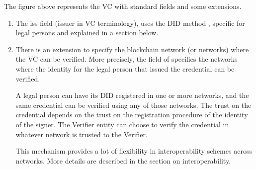 \documentclass[a4paper,12pt,english,openany]{sphinxmanual}
\begin{document}
\sphinxAtStartPar
The figure above represents the VC with standard fields and some extensions.
\begin{enumerate}
%
\item {} 
\sphinxAtStartPar
The iss field (issuer in VC terminology), uses the DID method , specific for legal persons and explained in a section below.

\item {} 
\sphinxAtStartPar
There is an extension to specify the blockchain network (or networks) where the VC can be verified. More precisely, the  field of  specifies the networks where the identity for the legal person that issued the credential can be verified.

\sphinxAtStartPar
A legal person can have its  DID registered in one or more networks, and the same credential can be verified using any of those networks. The trust on the credential depends on the trust on the registration procedure of the identity of the signer. The Verifier entity can choose to verify the credential in whatever network is trusted to the Verifier.

\sphinxAtStartPar
This mechanism provides a lot of flexibility in interoperability schemes across networks. More details are described in the section on interoperability.

\end{enumerate}
\end{document}
